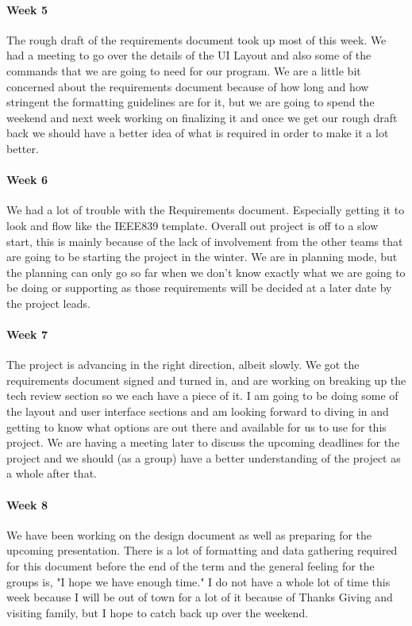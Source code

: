\documentclass[10pt,draftclsnofoot,onecolumn,retainorgcmds]{IEEEtran}
\begin{document}
\paragraph{Week 5}
The rough draft of the requirements document took up most of this week. We had a meeting to go over the details of the UI Layout and also some of the commands that we are going to need for our program. We are a little bit concerned about the requirements document because of how long and how stringent the formatting guidelines are for it, but we are going to spend the weekend and next week working on finalizing it and once we get our rough draft back we should have a better idea of what is required in order to make it a lot better.\\
\paragraph{Week 6}
We had a lot of trouble with the Requirements document. Especially getting it to look and flow like the IEEE839 template. Overall out project is off to a slow start, this is mainly because of the lack of involvement from the other teams that are going to be starting the project in the winter. We are in planning mode, but the planning can only go so far when we don't know exactly what we are going to be doing or supporting as those requirements will be decided at a later date by the project leads.\\
\paragraph{Week 7}
The project is advancing in the right direction, albeit slowly. We got the requirements document signed and turned in, and are working on breaking up the tech review section so we each have a piece of it. I am going to be doing some of the layout and user interface sections and am looking forward to diving in and getting to know what options are out there and available for us to use for this project. We are having a meeting later to discuss the upcoming deadlines for the project and we should (as a group) have a better understanding of the project as a whole after that.\\
\paragraph{Week 8}
We have been working on the design document as well as preparing for the upcoming presentation. There is a lot of formatting and data gathering required for this document before the end of the term and the general feeling for the groups is, "I hope we have enough time." I do not have a whole lot of time this week because I will be out of town for a lot of it because of Thanks Giving and visiting family, but I hope to catch back up over the weekend.\\
\end{document}
